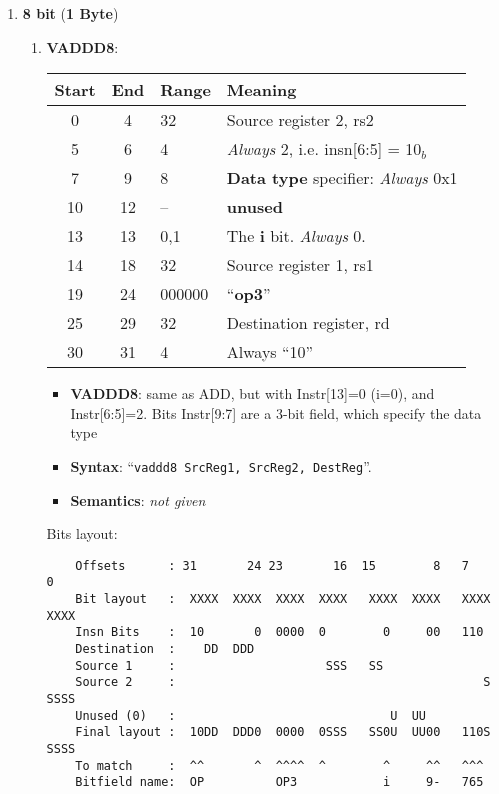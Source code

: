 \begin{enumerate}
\item \textbf{8 bit} (\textbf{1 Byte})
  \begin{enumerate}
  \item \textbf{VADDD8}:\\
    \begin{center}
      \begin{tabular}[p]{|c|c|l|l|}
        \hline
        \textbf{Start} & \textbf{End} & \textbf{Range} & \textbf{Meaning} \\
        \hline
        0 & 4 & 32 & Source register 2, rs2 \\
        5 & 6 & 4 & \emph{Always} 2, i.e. insn[6:5] = 10$_b$ \\
        7 & 9 & 8 & \textbf{Data type} specifier:  \emph{Always} 0x1\\
        10 & 12 & -- & \textbf{unused} \\
        13 & 13 & 0,1 & The \textbf{i} bit. \emph{Always} 0. \\
        14 & 18 & 32 & Source register 1, rs1 \\
        19 & 24 & 000000 & ``\textbf{op3}'' \\
        25 & 29 & 32 & Destination register, rd \\
        30 & 31 & 4 & Always ``10'' \\
        \hline
      \end{tabular}
    \end{center}
    \begin{itemize}
    \item []\textbf{VADDD8}: same as  ADD, but with Instr[13]=0 (i=0),
      and  Instr[6:5]=2.  Bits Instr[9:7]  are  a  3-bit field,  which
      specify the data type
    \item []\textbf{Syntax}: ``\texttt{vaddd8 SrcReg1, SrcReg2,
        DestReg}''.
    \item []\textbf{Semantics}: \emph{not given}
    \end{itemize}
    Bits layout:
\begin{verbatim}
    Offsets      : 31       24 23       16  15        8   7        0
    Bit layout   :  XXXX  XXXX  XXXX  XXXX   XXXX  XXXX   XXXX  XXXX
    Insn Bits    :  10       0  0000  0        0     00   110       
    Destination  :    DD  DDD                                       
    Source 1     :                     SSS   SS
    Source 2     :                                           S  SSSS
    Unused (0)   :                              U  UU               
    Final layout :  10DD  DDD0  0000  0SSS   SS0U  UU00   110S  SSSS
    To match     :  ^^       ^  ^^^^  ^        ^     ^^   ^^^
    Bitfield name:  OP          OP3            i     9-   765
\end{verbatim}


\end{enumerate}
\end{enumerate}
